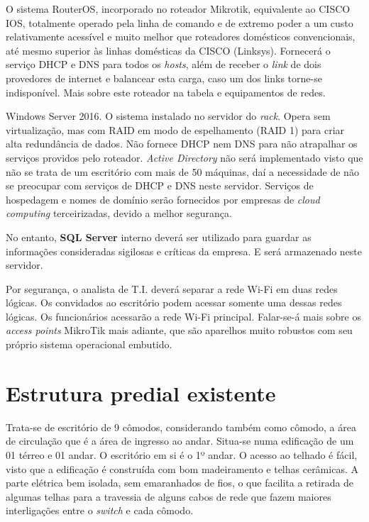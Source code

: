 \documentclass[	DIV=calc,%
							paper=a4,%
							fontsize=12pt,%
							onecolumn]{scrartcl}	 					%
\begin{document}
O sistema RouterOS, incorporado no roteador Mikrotik, equivalente ao CISCO IOS, totalmente operado pela linha de comando e de extremo poder a um custo relativamente acessível e muito melhor que roteadores domésticos convencionais, até mesmo superior às linhas domésticas da CISCO (Linksys). Fornecerá o serviço DHCP e DNS para todos os \textit{hosts}, além de receber o \textit{link} de dois provedores de internet e balancear esta carga, caso um dos links torne-se indisponível. Mais sobre este roteador na tabela e equipamentos de redes.


Windows Server 2016. O sistema instalado no servidor do \textit{rack}. Opera sem virtualização, mas com RAID em modo de espelhamento (RAID 1) para criar alta redundância de dados. Não fornece DHCP nem DNS para não atrapalhar os serviços providos pelo roteador. \textit{Active Directory }não será implementado visto que não se trata de um escritório com mais de 50 máquinas, daí a necessidade de não se preocupar com serviços de DHCP e DNS neste servidor. Serviços de hospedagem e nomes de domínio serão fornecidos por empresas de \textit{cloud computing} terceirizadas, devido a melhor segurança. 

No entanto, \textbf{SQL Server} interno deverá ser utilizado para guardar as informações consideradas sigilosas e críticas da empresa. E será armazenado neste servidor.

Por segurança, o analista de T.I. deverá separar a rede Wi-Fi em duas redes lógicas. Os convidados ao escritório podem acessar somente uma dessas redes lógicas. Os funcionários acessarão a rede Wi-Fi principal. Falar-se-á mais sobre os \textit{access points} MikroTik mais adiante, que são aparelhos muito robustos com seu próprio sistema operacional embutido.


\section{Estrutura predial existente}

Trata-se de escritório de 9 cômodos, considerando também como cômodo, a área de circulação que é a área de ingresso ao andar. Situa-se numa edificação de um 01 térreo e 01 andar. O escritório em si é o 1º andar. O acesso ao telhado é fácil, visto que a edificação é construída com bom madeiramento e telhas cerâmicas. A parte elétrica bem isolada, sem emaranhados de fios, o que facilita a retirada de algumas telhas para a travessia de alguns cabos de rede que fazem maiores interligações entre o \textit{switch} e cada cômodo. \\
\end{document}
